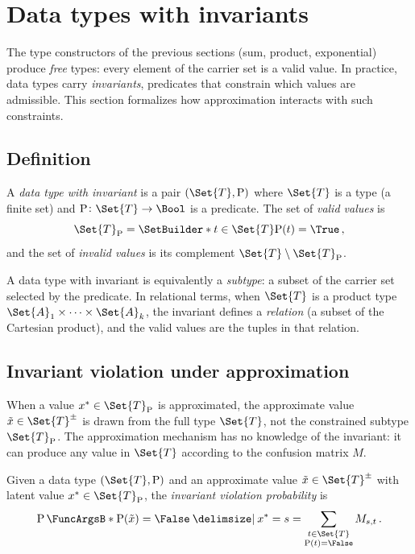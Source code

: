 \documentclass[ ../main.tex]{subfiles}
\begin{document}
\section{Data types with invariants}
\label{sec:invariants}

The type constructors of the previous sections (sum, product, exponential) produce \emph{free} types: every element of the carrier set is a valid value.
In practice, data types carry \emph{invariants}, predicates that constrain which values are admissible.
This section formalizes how approximation interacts with such constraints.

\subsection{Definition}

\begin{definition}
\label{def:data_type_invariant}
A \emph{data type with invariant} is a pair $(\Set{T}, \Fun{P})$ where $\Set{T}$ is a type (a finite set) and $\Fun{P} \colon \Set{T} \to \Bool$ is a predicate.
The set of \emph{valid values} is
\begin{equation}
\Set{T}_{\Fun{P}} = \SetBuilder*{t \in \Set{T}}{\Fun{P}(t) = \True}\,,
\end{equation}
and the set of \emph{invalid values} is its complement $\Set{T} \setminus \Set{T}_{\Fun{P}}$.
\end{definition}

A data type with invariant is equivalently a \emph{subtype}: a subset of the carrier set selected by the predicate.
In relational terms, when $\Set{T}$ is a product type $\Set{A}_1 \times \cdots \times \Set{A}_k$, the invariant defines a \emph{relation} (a subset of the Cartesian product), and the valid values are the tuples in that relation.

\subsection{Invariant violation under approximation}

When a value $x^* \in \Set{T}_{\Fun{P}}$ is approximated, the approximate value $\tilde{x} \in \AT{\Set{T}}$ is drawn from the full type $\Set{T}$, not the constrained subtype $\Set{T}_{\Fun{P}}$.
The approximation mechanism has no knowledge of the invariant: it can produce any value in $\Set{T}$ according to the confusion matrix $M$.

\begin{definition}
\label{def:violation_prob}
Given a data type $(\Set{T}, \Fun{P})$ and an approximate value $\tilde{x} \in \AT{\Set{T}}$ with latent value $x^* \in \Set{T}_{\Fun{P}}$, the \emph{invariant violation probability} is
\begin{equation}
\label{eq:violation_prob}
\Prob{\Fun{P}(\tilde{x}) = \False \Given x^* = s} = \sum_{\substack{t \in \Set{T} \\ \Fun{P}(t) = \False}} M_{s, t}\,.
\end{equation}
\end{definition}
\end{document}
